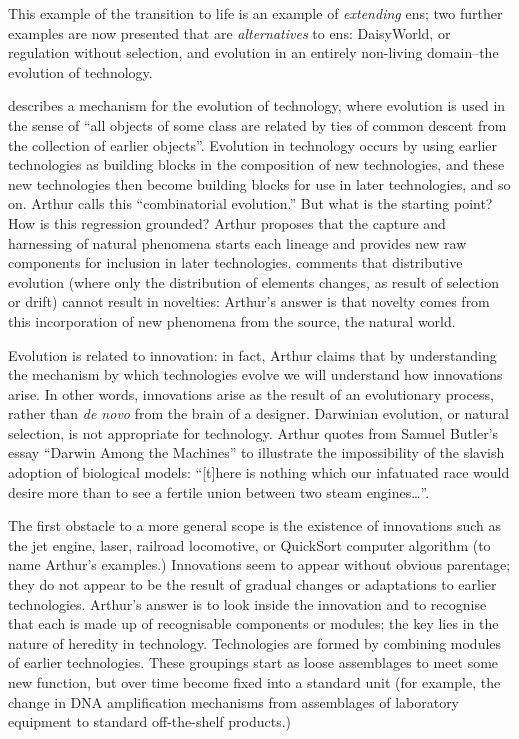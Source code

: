 This example of the transition to life is an example of \emph{extending} \gls{ens}; two further examples are now presented that are \emph{alternatives} to \gls{ens}: DaisyWorld, or regulation without selection, and evolution in an entirely non-living domain--the evolution of technology. 

\Textcite{Arthur2009} describes a mechanism for the evolution of technology, where evolution is used in the sense of ``all objects of some class are related by ties of common descent from the collection of earlier objects''. Evolution in technology occurs by using earlier technologies as building blocks in the composition of new technologies, and these new technologies then become building blocks for use in later technologies, and so on. Arthur calls this ``combinatorial evolution.'' But what is the starting point? How is this regression grounded? Arthur proposes that the capture and harnessing of natural phenomena starts each lineage and provides new raw components for inclusion in later technologies. \Textcite{Bourrat2015} comments that distributive evolution (where only the distribution of elements changes, as result of selection or drift) cannot result in novelties: Arthur's answer is that novelty comes from this incorporation of new phenomena from the source, the natural world.

Evolution is related to innovation: in fact, Arthur claims that by understanding the mechanism by which technologies evolve we will understand how innovations arise. In other words, innovations arise as the result of an evolutionary process, rather than \textit{de novo} from the brain of a designer. Darwinian evolution, or natural selection, is not appropriate for technology. Arthur quotes from Samuel Butler's essay ``Darwin Among the Machines'' to illustrate the impossibility of the slavish adoption of biological models: ``{[}t{]}here is nothing which our infatuated race would desire more than to see a fertile union between two steam engines\ldots{}''.

The first obstacle to a more general scope is the existence of innovations such as the jet engine, laser, railroad locomotive, or QuickSort computer algorithm (to name Arthur's examples.) Innovations seem to appear without obvious parentage; they do not appear to be the result of gradual changes or adaptations to earlier technologies. Arthur's answer is to look inside the innovation and to recognise that each is made up of recognisable components or modules; the key lies in the nature of heredity in technology. Technologies are formed by combining modules of earlier technologies. These groupings start as loose assemblages to meet some new function, but over time become fixed into a standard unit (for example, the change in DNA amplification mechanisms from assemblages of laboratory equipment to standard off-the-shelf products.)

